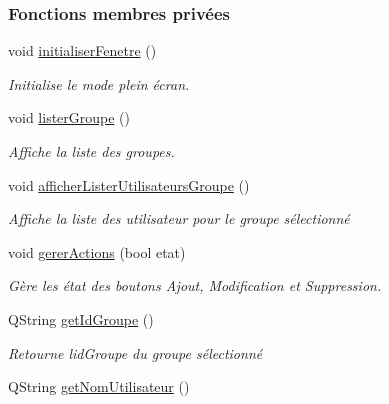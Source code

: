 \subsubsection*{Fonctions membres privées}
\begin{DoxyCompactItemize}
\item 
void \hyperlink{class_ihm_gestion_groupe_a7206d6ced32c6c5e8be7ee474195ca73}{initialiser\+Fenetre} ()
\begin{DoxyCompactList}\small\item\em Initialise le mode plein écran. \end{DoxyCompactList}\item 
void \hyperlink{class_ihm_gestion_groupe_a7afabe81c405b35e7cfd4e760eda8c84}{lister\+Groupe} ()
\begin{DoxyCompactList}\small\item\em Affiche la liste des groupes. \end{DoxyCompactList}\item 
void \hyperlink{class_ihm_gestion_groupe_a491098bb1e69aa1c09b76c3459da067f}{afficher\+Lister\+Utilisateurs\+Groupe} ()
\begin{DoxyCompactList}\small\item\em Affiche la liste des utilisateur pour le groupe sélectionné \end{DoxyCompactList}\item 
void \hyperlink{class_ihm_gestion_groupe_a9e6a325b8845fb3c22157b2b59436610}{gerer\+Actions} (bool etat)
\begin{DoxyCompactList}\small\item\em Gère les état des boutons Ajout, Modification et Suppression. \end{DoxyCompactList}\item 
Q\+String \hyperlink{class_ihm_gestion_groupe_a0f6dd8f645a5bf789521a25322004146}{get\+Id\+Groupe} ()
\begin{DoxyCompactList}\small\item\em Retourne l\textquotesingle{}id\+Groupe du groupe sélectionné \end{DoxyCompactList}\item 
Q\+String \hyperlink{class_ihm_gestion_groupe_ae214f51e88aeb029e6956eb833f7542c}{get\+Nom\+Utilisateur} ()
\end{DoxyCompactItemize}
